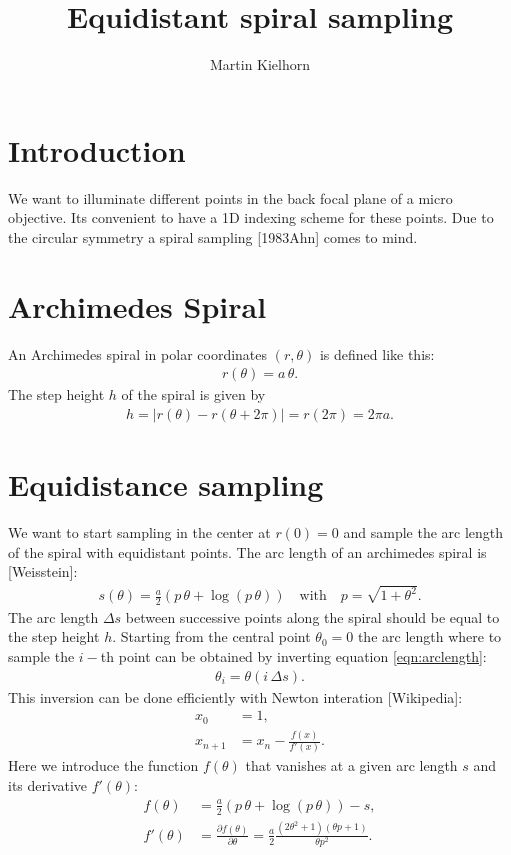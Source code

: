 \documentclass[twocolumn,DIV18]{scrartcl}
\newcommand{\abs}[1]{\lvert #1 \rvert}
\renewcommand{\(}{\left(}
\renewcommand{\)}{\right)}
\begin{document}
\title{Equidistant spiral sampling}
\author{Martin Kielhorn}
\maketitle
\section{Introduction}
We want to illuminate different points in the back focal plane of a
micro objective. Its convenient to have a 1D indexing scheme for these
points. Due to the circular symmetry a spiral sampling [1983Ahn] comes
to mind. 

\section{Archimedes Spiral}
An Archimedes spiral in polar coordinates $(r,\theta)$ is defined like
this:
\begin{align}
  r(\theta)=a\,\theta.
\end{align}
The step height $h$ of the spiral is given by
\begin{align}
  h=\abs{r(\theta)-r(\theta+2\pi)}=r(2\pi)=2\pi a.
\end{align}
\section{Equidistance sampling}
We want to start sampling in the center at $r(0)=0$ and sample the arc
length of the spiral with equidistant points. The arc length of an
archimedes spiral is [Weisstein]:
\begin{align} \label{eqn:arclength}
  s(\theta)=\frac{a}{2}\(p\,\theta + \log(p\,\theta)\)\quad\textrm{with}\quad
  p=\sqrt{1+\theta^2}.
\end{align}
The arc length $\Delta s$ between successive points along the spiral
should be equal to the step height $h$. Starting from the central
point $\theta_0=0$ the arc length where to sample the $i-$th point can
be obtained by inverting equation \eqref{eqn:arclength}:
\begin{align}
  \theta_i=\theta(i\,\Delta s).
\end{align}
This inversion can be done efficiently with Newton interation
[Wikipedia]:
\begin{align}
  x_0&=1,\\
  x_{n+1}&=x_n-\frac{f(x)}{f'(x)}.
\end{align}
Here we introduce the function $f(\theta)$ that vanishes at a given arc
length $s$ and its derivative $f'(\theta)$:
\begin{align}
  \label{eqn:f}
  f(\theta)&=\frac{a}{2}\(p\,\theta+\log(p\,\theta)\)-s,\\
  f'(\theta)&=\frac{\partial f(\theta)}{\partial \theta}=
  \frac{a}{2}\frac{(2\theta^2+1)(\theta p + 1)}{\theta p^2}.
\end{align}
\end{document}
